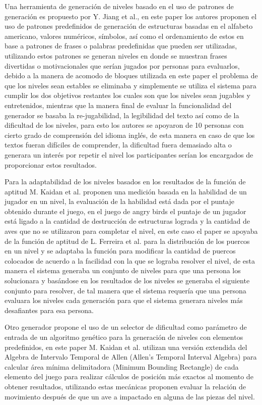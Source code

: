 Una herramienta de generación de niveles basado en el uso de patrones de
generación es propuesto por Y. Jiang et al.\cite{Jiang2017}, en este paper los
autores proponen el uso de patrones predefinidos de generación de estructuras
basadas en el alfabeto americano, valores numéricos, símbolos, así como el
ordenamiento de estos en base a patrones de frases o palabras predefinidas que
pueden ser utilizadas, utilizando estos patrones se generan niveles en donde se
muestran frases divertidas o motivacionales que serían jugados por personas para
evaluarlos, debido a la manera de acomodo de bloques utilizada en este paper el
problema de que los niveles sean estables se eliminaba y simplemente se utiliza
el sistema para cumplir los dos objetivos restantes los cuales son que los
niveles sean jugables y entretenidos, mientras que la manera final de evaluar la
funcionalidad del generador se basaba la re-jugabilidad, la legibilidad del texto
así como de la dificultad de los niveles, para esto los autores se apoyaron de
10 personas con cierto grado de comprensión del idioma inglés, de esta manera en
caso de que los textos fueran difíciles de comprender, la dificultad fuera
demasiado alta o generara un interés por repetir el nivel los participantes
serían los encargados de proporcionar estos resultados.

Para la adaptabilidad de los niveles basados en los resultados de la función de
aptitud M. Kaidan et al.\cite{Kaidan2015} proponen una medición basada en la
habilidad de un jugador en un nivel, la evaluación de la habilidad está dada por
el puntaje obtenido durante el juego, en el juego de angry birds el puntaje de
un jugador está ligado a la cantidad de destrucción de estructuras lograda y la
cantidad de aves que no se utilizaron para completar el nivel, en este caso el
paper se apoyaba de la función de aptitud de L. Ferreira et
al.\cite{Ferreira2014} para la distribución de los puercos en un nivel y se
adaptaba la función para modificar la cantidad de puercos colocados de acuerdo a
la facilidad con la que se lograba resolver el nivel, de esta manera el sistema
generaba un conjunto de niveles para que una persona los solucionara y basándose
en los resultados de los niveles se generaba el siguiente conjunto para
resolver, de tal manera que el sistema requería que una persona evaluara los
niveles cada generación para que el sistema generara niveles más desafiantes
para esa persona.

Otro generador propone el uso de un selector de dificultad como parámetro de
entrada de un algoritmo genético para la generación de niveles con elementos
predefinidos, en este paper M. Kaidan et al.\cite{Kaidan2016} utilizan una
versión extendida del Algebra de Intervalo Temporal de Allen (Allen's Temporal
Interval Algebra)\cite{ALLEN1990} para calcular área mínima delimitadora
(Minimum Bounding Rectangle) de cada elemento del juego para realizar cálculos
de posición más exactos al momento de obtener resultados, utilizando estas
mecánicas proponen evaluar la relación de movimiento después de que un ave a
impactado en alguna de las piezas del nivel.

